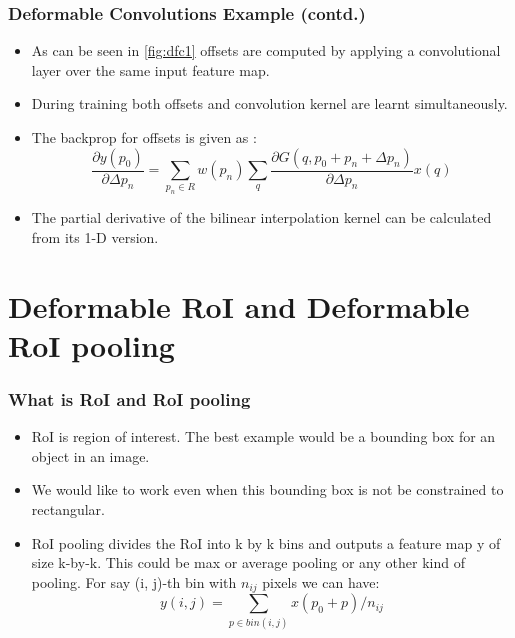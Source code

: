 \documentclass{beamer}
\begin{document}
\begin{frame}
  \frametitle{Deformable Convolutions Example (contd.)}
  \begin{itemize}
  \item As can be seen in \ref{fig:dfc1} offsets are computed by applying a convolutional layer over the same input feature map.
  \item During training both offsets and convolution kernel are learnt simultaneously.
  \item The backprop for offsets is given as :
    $$\frac{\partial y(p_0)}{\partial \Delta p_n} = \sum_{p_n \in R}w(p_n) \sum_{q}\frac{\partial G(q, p_0 + p_n + \Delta p_n)}{\partial \Delta p_n} x(q)$$
  \item The partial derivative of the bilinear interpolation kernel can be calculated from its 1-D version.
  \end{itemize}
\end{frame}

\section{Deformable RoI and Deformable RoI pooling}
\begin{frame}
  \frametitle{What is RoI and RoI pooling}
  \begin{itemize}
  \item RoI is region of interest. The best example would be a bounding box for an object in an image.
  \item We would like to work even when this bounding box is not be constrained to rectangular.
  \item RoI pooling divides the RoI into k by k bins and outputs a feature map y of size k-by-k. This could be max or average pooling or any other kind of pooling. For say (i, j)-th bin with $n_{ij}$ pixels we can have:
    $$y(i, j) = \sum_{p \in bin(i,j)}x(p_0 + p)/n_{ij}$$
  \end{itemize}
\end{frame}
\end{document}
